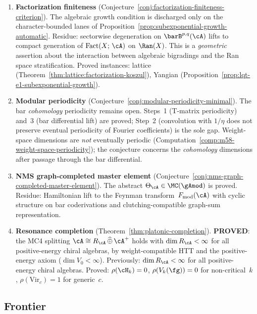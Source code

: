 \begin{enumerate}
\item \textbf{Factorization finiteness}
 (Conjecture~\ref{conj:factorization-finiteness-criterion}).
 The algebraic growth condition is discharged only on the
 character-bounded lanes of
 Proposition~\ref{prop:subexponential-growth-automatic}.
 Residue: sectorwise degeneration on
 $\barB^{p,q}(\cA)$ lifts to compact generation of
 $\mathrm{Fact}(X;\,\cA)$ on $\Ran(X)$.
 This is a \emph{geometric} assertion about the interaction
 between algebraic bigradings and the Ran space stratification.
 Proved instances: lattice
 (Theorem~\ref{thm:lattice:factorization-koszul}),
 Yangian (Proposition~\ref{prop:lqt-e1-subexponential-growth}).

\item \textbf{Modular periodicity}
 (Conjecture~\ref{conj:modular-periodicity-minimal}).
 The bar \emph{cohomology} periodicity remains open.
 Steps~1 (T-matrix periodicity) and~3 (bar differential lift) are
 proved; Step~2 (convolution with $1/\eta$ does not preserve
 eventual periodicity of Fourier coefficients) is the sole gap.
 Weight-space dimensions are \emph{not} eventually periodic
 (Computation~\ref{comp:m58-weight-space-periodicity}); the
 conjecture concerns the \emph{cohomology} dimensions after
 passage through the bar differential.

\item \textbf{NMS graph-completed master element}
 (Conjecture~\ref{conj:nms-graph-completed-master-element}).
 The abstract $\Theta_\cA \in \MC(\gAmod)$ is proved.
 Residue: Hamiltonian lift to the Feynman
 transform~$F_{\mathrm{mod}}(\cA)$ with cyclic structure on bar
 coderivations and clutching-compatible graph-sum representation.

\item \textbf{Resonance completion}
 (Theorem~\ref{thm:platonic-completion}).
 \textbf{PROVED}: the MC4 splitting
 $\cA \cong R_\cA \,\widehat{\oplus}\, \cA^+$ holds with
 $\dim R_\cA < \infty$ for all positive-energy
 chiral algebras, by weight-compatible HTT and the
 positive-energy axiom ($\dim V_0 < \infty$).
 Previously: $\dim R_\cA < \infty$ for all positive-energy
 chiral algebras.
 Proved: $\rho(\cH_k) = 0$, $\rho(V_k(\fg)) = 0$ for
 non-critical~$k$, $\rho(\mathrm{Vir}_c) = 1$ for generic~$c$.
\end{enumerate}

\subsection{Frontier}\label{subsec:concordance-true-frontier}

